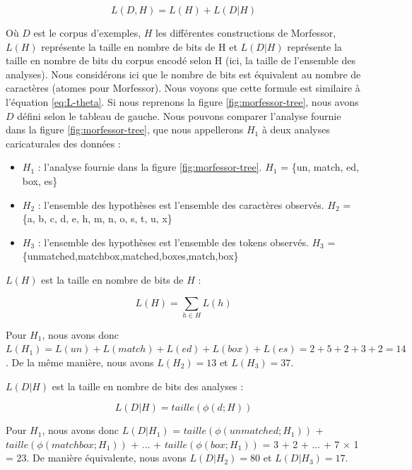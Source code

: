 \documentclass[12pt,a4paper,times,twoside,openright]{report}
\begin{document}
\begin{equation}
L(D,H) = L(H) + L(D|H)
\end{equation}

Où $D$ est le corpus d'exemples, $H$ les différentes constructions de Morfessor, $L(H)$ représente la taille en nombre de bits de H et $L(D|H)$ représente la taille en nombre de bits du corpus encodé selon H (ici, la taille de l'ensemble des analyses). Nous considérons ici que le nombre de bits est équivalent au nombre de caractères (atomes pour Morfessor). Nous voyons que cette formule est similaire à l'équation \ref{eq:L-theta}. Si nous reprenons la figure \ref{fig:morfessor-tree}, nous avons $D$ défini selon le tableau de gauche. Nous pouvons comparer l'analyse fournie dans la figure \ref{fig:morfessor-tree}, que nous appellerons $H_{1}$ à deux analyses caricaturales des données :

\begin{itemize}
    \item $H_{1}$ : l'analyse fournie dans la figure \ref{fig:morfessor-tree}. $H_{1}$ = \{un, match, ed, box, es\}
    \item $H_{2}$ : l'ensemble des hypothèses est l'ensemble des caractères observés. $H_{2}$ = \{a, b, c, d, e, h, m, n, o, s, t, u, x\}
    \item $H_{3}$ : l'ensemble des hypothèses est l'ensemble des tokens observés. $H_{3}$ = \{unmatched,matchbox,matched,boxes,match,box\}
\end{itemize}

$L(H)$ est la taille en nombre de bits de $H$ :

\begin{equation}
L(H) = \sum_{h \in H} L(h)
\end{equation}

Pour $H_{1}$, nous avons donc $L(H_{1}) = L(un) + L(match) + L(ed) + L(box) + L(es) = 2 + 5 + 2 + 3 + 2 = 14$. De la même manière, nous avons $L(H_{2})=13$ et $L(H_{3})=37$.

$L(D|H)$ est la taille en nombre de bits des analyses :

\begin{equation}
L(D|H) = taille(\phi(d;H))
\end{equation}

Pour $H_{1}$, nous avons donc $L(D|H_{1})$ = $taille(\phi(unmatched;H_{1}))$ +\\$taille(\phi(matchbox;H_{1}))$ + ... + $taille(\phi(box;H_{1}))$ = 3 + 2 + ... + 7 $\times$ 1 = 23. De manière équivalente, nous avons $L(D|H_{2}) = 80$ et $L(D|H_{3}) = 17$.
\end{document}
